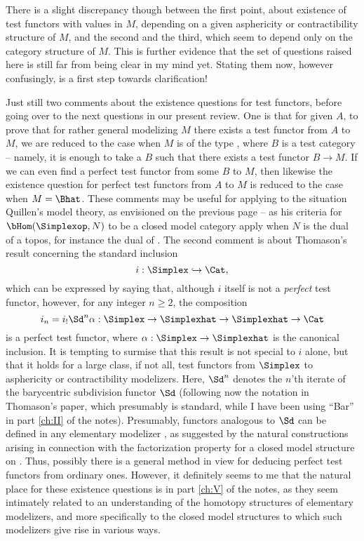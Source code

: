 There is a slight discrepancy though between the first point, about
existence of test functors with values in $M$, depending on a given
asphericity or contractibility structure of $M$, and the second and
the third, which seem to depend only on the category structure of
$M$. This is further evidence that the set of questions raised here is
still far from being clear in my mind yet. Stating them now, however
confusingly, is a first step towards clarification!

\bigbreak
\presectionfill{}\par

Just still two comments about the existence questions for test
functors, before going over to the next questions in our present
review. One is that for given $A$, to prove that for rather general
modelizing $M$ there exists a test functor from $A$ to $M$, we are
reduced to the case when $M$ is of the type \Bhat, where $B$ is a test
category -- namely, it is enough to take a $B$ such that there exists
a test functor $B\to M$. If we can even find a perfect test functor
from some $B$ to $M$, then likewise the existence question for perfect
test functors from $A$ to $M$ is reduced to the case when
$M=\Bhat$. These comments may be useful for applying to the situation
Quillen's model theory, as envisioned on the previous page -- as his
criteria for $\bHom(\Simplexop,N)$ to be a closed model category
apply when $N$ is the dual of a topos, for instance the dual of
\Bhat. The second comment is about Thomason's result concerning the
standard inclusion
\[i:\Simplex\hookrightarrow \Cat,\]
which can be expressed by saying that, although $i$ itself is not a
\emph{perfect} test functor, however, for any integer $n\ge2$, the
composition
\[i_n=i_!\Sd^n \alpha: \Simplex\to\Simplexhat\to\Simplexhat\to\Cat\]
is a perfect test functor, where $\alpha:\Simplex\to\Simplexhat$ is
the canonical inclusion. It is tempting to surmise that this result is
not special to $i$ alone, but that it holds for a large class, if not
all, test functors from $\Simplex$ to asphericity or contractibility
modelizers. Here, $\Sd^n$ denotes the $n$'th iterate of the
barycentric subdivision functor $\Sd$ (following now the notation in
Thomason's paper, which presumably is standard, while I have been
using ``Bar'' in part \ref{ch:II} of the notes). Presumably, functors
analogous to $\Sd$ can be defined in any elementary modelizer \Ahat,
as suggested by the natural constructions arising in connection with
the factorization property for a closed model structure on
\Ahat. Thus, possibly there is a general method in view for deducing
perfect test functors from ordinary ones. However, it definitely seems
to me that the natural place for these existence questions is in part
\ref{ch:V} of the notes, as they seem intimately related to an
understanding of the homotopy structures of elementary modelizers, and
more specifically to the closed model structures to which such
modelizers give rise in various ways.

